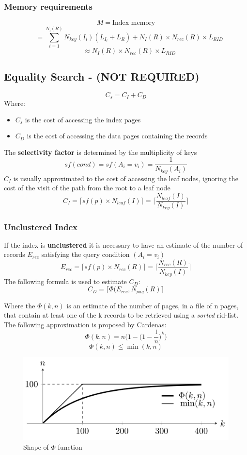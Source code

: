 \subsubsection{Memory requirements}
\[
M = \text{Index memory}\]\[
\quad = \sum_{i=1}^{N_i(R)} N_{key}(I_i)(L_{I_i} + L_R) + N_I(R) \times N_{rec}(R) \times L_{RID}\]\[
\quad \approx N_I(R) \times N_{rec}(R) \times L_{RID}
\]

\subsection{Equality Search - (NOT REQUIRED)}
\[C_s = C_I + C_D\]
Where:
\begin{itemize}
    \item \(C_s\) is the cost of accessing the index pages
    \item \(C_D\) is the cost of accessing the data pages containing the records
\end{itemize}
The \textbf{selectivity factor} is determined by the multiplicity of keys
\[sf(cond) = sf(A_i = v_i) = \frac{1}{N_{key}(A_i)}\]
\(C_I\) is usually approximated to the cost of accessing the leaf nodes, ignoring the cost of the visit of the path from the root to a leaf node
\[C_I = \lceil sf(p) \times N_{leaf}(I)\rceil = \Bigg\lceil \frac{N_{leaf}(I)}{N_{key}(I)} \Bigg\rceil\]

\subsubsection{Unclustered Index}
If the index is \textbf{unclustered} it is necessary to have an estimate of the number of records \(E_{rec}\) satisfying the query condition \((A_i = v_i)\)
\[E_{rec} = \lceil sf(p) \times N_{rec}(R)\rceil = \Bigg\lceil \frac{N_{rec}(R)}{N_{key}(I)} \Bigg\rceil\]
The following formula is used to estimate \(C_D\):
\[C_D = \lceil \Phi(E_{rec}, N_{pag}(R) \rceil\]
\begin{tcolorbox}
Where the \(\Phi(k, n)\) is an estimate of the number of pages, in a file of n pages, that contain at least one of the k records to be retrieved using a \textit{sorted} rid-list. The following approximation is proposed by Cardenas:
\[
\Phi(k, n) = n \Bigg(1-\Bigg(1-\frac{1}{n}\Bigg)^k\Bigg)
\]
\[\Phi(k, n) \leq \min(k, n)\]
\end{tcolorbox}

\begin{figure}[!h]
    \centering
    \includegraphics[width=0.5\linewidth]{images/DBMS_Internals/NonKeyAttributeOrganizations/phi_function.jpeg}
    \caption{Shape of \(\Phi\) function}
\end{figure}

